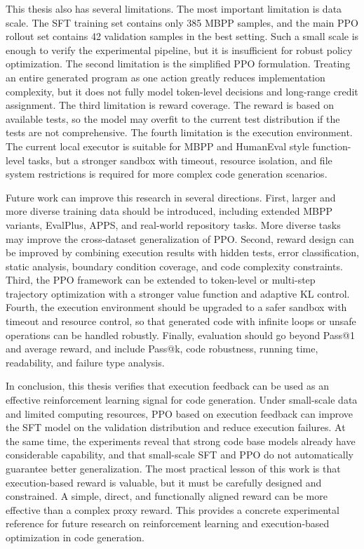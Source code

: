 \begin{digest}
This thesis also has several limitations. The most important limitation is data scale. The SFT training set contains only 385 MBPP samples, and the main PPO rollout set contains 42 validation samples in the best setting. Such a small scale is enough to verify the experimental pipeline, but it is insufficient for robust policy optimization. The second limitation is the simplified PPO formulation. Treating an entire generated program as one action greatly reduces implementation complexity, but it does not fully model token-level decisions and long-range credit assignment. The third limitation is reward coverage. The reward is based on available tests, so the model may overfit to the current test distribution if the tests are not comprehensive. The fourth limitation is the execution environment. The current local executor is suitable for MBPP and HumanEval style function-level tasks, but a stronger sandbox with timeout, resource isolation, and file system restrictions is required for more complex code generation scenarios.

Future work can improve this research in several directions. First, larger and more diverse training data should be introduced, including extended MBPP variants, EvalPlus, APPS, and real-world repository tasks. More diverse tasks may improve the cross-dataset generalization of PPO. Second, reward design can be improved by combining execution results with hidden tests, error classification, static analysis, boundary condition coverage, and code complexity constraints. Third, the PPO framework can be extended to token-level or multi-step trajectory optimization with a stronger value function and adaptive KL control. Fourth, the execution environment should be upgraded to a safer sandbox with timeout and resource control, so that generated code with infinite loops or unsafe operations can be handled robustly. Finally, evaluation should go beyond Pass@1 and average reward, and include Pass@k, code robustness, running time, readability, and failure type analysis.

In conclusion, this thesis verifies that execution feedback can be used as an effective reinforcement learning signal for code generation. Under small-scale data and limited computing resources, PPO based on execution feedback can improve the SFT model on the validation distribution and reduce execution failures. At the same time, the experiments reveal that strong code base models already have considerable capability, and that small-scale SFT and PPO do not automatically guarantee better generalization. The most practical lesson of this work is that execution-based reward is valuable, but it must be carefully designed and constrained. A simple, direct, and functionally aligned reward can be more effective than a complex proxy reward. This provides a concrete experimental reference for future research on reinforcement learning and execution-based optimization in code generation.
\end{digest}
